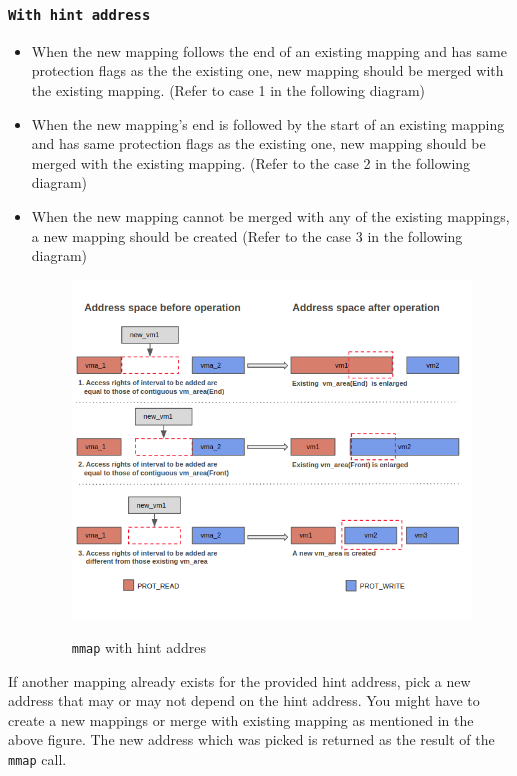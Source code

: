 \documentclass[12pt]{article}
\begin{document}
	
	\subsubsection *{\tt{With hint address}}
	
		\begin{itemize}
	    \item When the new mapping follows the end of an existing mapping and has same protection flags as the the existing one, new mapping should be merged with the existing mapping. 
	    (Refer to case 1  in the following diagram)
	    \item  When the new mapping's end is followed by the start of an existing mapping and has same protection flags as the existing one, new mapping should be merged with the existing mapping. 
	    (Refer to the case 2 in the following diagram)
	    \item  When the new mapping cannot be merged with any of the existing mappings, a new mapping should be created (Refer to the case 3 in the following diagram)
	     \begin{figure}[H]
	    \centering
	    \includegraphics[scale=0.6]{mm4.png}
	    \label{fig:my_label}
	    \caption{{\tt mmap} with hint addres}
	    \end{figure}
	\end{itemize}
	
	If another mapping already exists for the provided hint address, pick a new address that may or may not depend on the hint address. You might have to create a new mappings or merge with existing mapping as mentioned in the above figure. The new address which was picked is returned as the result of the {\tt mmap} call.
\end{document}
